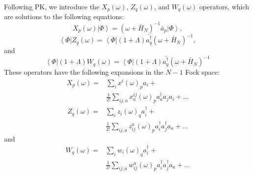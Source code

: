 \documentclass[aps,prb,preprint,groupaddress,floatfix]{revtex4}
\begin{document}
Following PK, we introduce the $X_p(\omega)$, $Z_q(\omega)$, and $W_q(\omega)$
operators, which are solutions to the following equations:
\begin{equation}
X_{p}(\omega) \left| \Phi \right> = 
\left( \omega + \bar{H}_N \right)^{-1}
\bar{a}_p \left| \Phi \right>,
\end{equation}
\begin{equation}
\left< \Phi \right| Z_{q}(\omega) = 
\left< \Phi \right| (1+\Lambda) \bar{a^{\dagger}_q}
\left( \omega + \bar{H}_N \right)^{-1},
\end{equation}
and
\begin{equation}
\left< \Phi \right| (1+\Lambda) W_{q}(\omega) = 
\left< \Phi \right| (1+\Lambda) \bar{a^{\dagger}_q}
\left( \omega + \bar{H}_N \right)^{-1}
\end{equation}
These operators have the following expansions in the $N-1$ Fock space:
\begin{equation}
\label{eq:Xomega}
\begin{split}
X_{p}(\omega) =& \sum_i x^i(\omega)_p a_i +\\
&\frac{1}{2!}\sum_{ij,a} x^{ij}_a(\omega)_p a^{\dagger}_a a_j a_i + ...
\end{split}
\end{equation}
\begin{equation}
\label{eq:Zomega}
\begin{split}
Z_{q}(\omega) =& \sum_i z_i(\omega)_q a^{\dagger}_i +\\
&\frac{1}{2!}\sum_{ij,a} z_{ij}^a(\omega)_p a^{\dagger}_i a^{\dagger}_j a_a + ...
\end{split}
\end{equation}
and
\begin{equation}
\label{eq:Womega}
\begin{split}
W_{q}(\omega) =& \sum_i w_i(\omega)_q a^{\dagger}_i +\\
&\frac{1}{2!}\sum_{ij,a} w_{ij}^a(\omega)_p a^{\dagger}_i a^{\dagger}_j a_a + ...
\end{split}
\end{equation}
\end{document}
